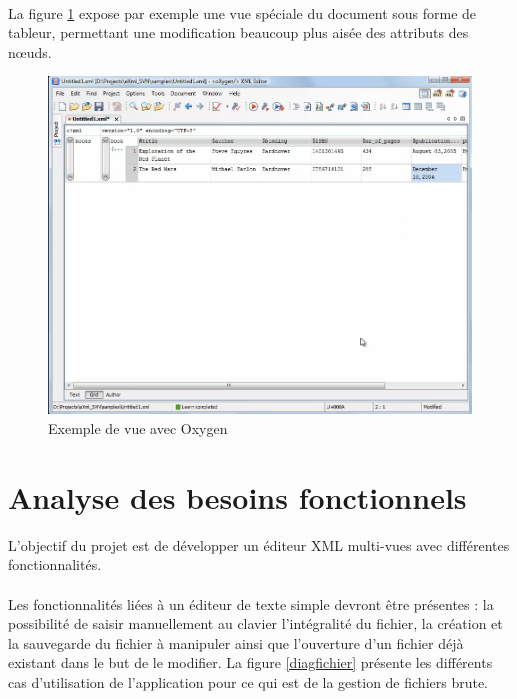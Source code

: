 \paragraph{}

La figure \ref{oxygen} expose par exemple une vue spéciale du document sous forme de tableur, permettant une modification beaucoup plus aisée des attributs des nœuds.

%

\begin{figure}[h!]
\begin{minipage}[b]{\linewidth}
\centering \includegraphics[scale=0.5]{images/analyse-oxygen1.png}
\caption{Exemple de vue avec Oxygen}
\label{oxygen}
\end{minipage}
\end{figure}


\section{Analyse des besoins fonctionnels}
L'objectif du projet est de développer un éditeur XML multi-vues avec différentes fonctionnalités.
\paragraph{}
Les fonctionnalités liées à un éditeur de texte simple devront être présentes : la possibilité de saisir manuellement au clavier l'intégralité du fichier, la création et la sauvegarde du fichier à manipuler ainsi que l'ouverture d'un fichier déjà existant dans le but de le modifier. La figure \ref{diagfichier} présente les différents cas d'utilisation de l'application pour ce qui est de la gestion de fichiers brute.

